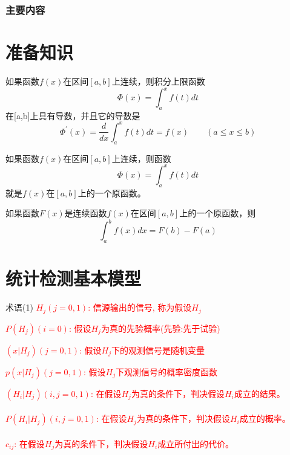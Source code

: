\begin{frame}
  \frametitle{主要内容}
  \tableofcontents[hideallsubsections]
\end{frame}

\section{准备知识}
\begin{frame}
\begin{theorem}
	如果函数$f(x)$在区间$[a,b]$上连续，则积分上限函数
	\[\Phi(x)=\int_a^x f(t)dt\]
	在[a,b]上具有导数，并且它的导数是
	\[\Phi^\prime(x)=\frac{d}{dx}\int_a^xf(t)dt=f(x)\qquad (a\le x\le b) \]
\end{theorem}
\begin{theorem}
	如果函数$f(x)$在区间$[a,b]$上连续，则函数
	\[\Phi(x)=\int_a^x f(t)dt\]	
	就是$f(x)$在$[a,b]$上的一个原函数。
\end{theorem}
\end{frame}

\begin{frame}
\begin{theorem}
	如果函数$F(x)$是连续函数$f(x)$在区间$[a,b]$上的一个原函数，则
	\[\int_a^b f(x)dx=F(b)-F(a)\]	
\end{theorem}
\end{frame}

\section{统计检测基本模型}

\begin{frame}{术语(1)}
\textcolor{red}{$H_j(j=0,1)$: 信源输出的信号, 称为假设$H_j$}

\bigskip

\textcolor{red}{$P(H_j)(i=0)$: 假设$H_j$为真的先验概率(先验:先于试验)}


\bigskip
\textcolor{red}{$(x|H_j)(j=0,1)$: 假设$H_j$下的观测信号是随机变量}

\bigskip

\textcolor{red}{$p(x|H_j)(j=0,1)$: 假设$H_j$下观测信号的概率密度函数}

\bigskip

\textcolor{red}{$(H_i|H_j)(i,j=0,1)$: 在假设$H_j$为真的条件下，判决假设$H_i$成立的结果。}\\
~\\
\textcolor{red}{$P(H_i|H_j)(i,j=0,1)$: 在假设$H_j$为真的条件下，判决假设$H_i$成立的概率。}\\
~\\
\textcolor{red}{$c_{ij}$: 在假设$H_j$为真的条件下，判决假设$H_i$成立所付出的代价。}
 
\end{frame}

